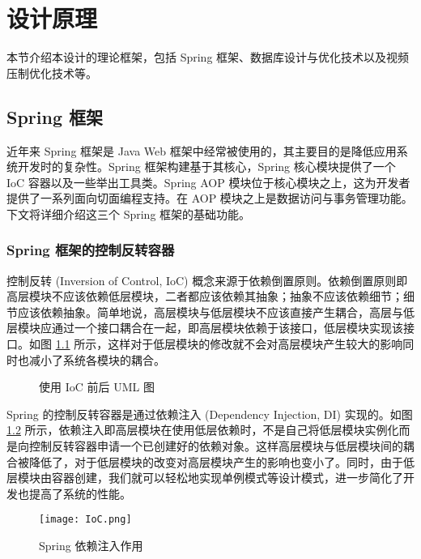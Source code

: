 \chapter{设计原理}\label{sec:theory}

本节介绍本设计的理论框架，包括 Spring 框架、数据库设计与优化技术以及视频压制优化技术等。

\section{Spring 框架}

近年来 Spring 框架是 Java Web 框架中经常被使用的，其主要目的是降低应用系统开发时的复杂性。Spring 框架构建基于其核心，Spring 核心模块提供了一个 IoC 容器以及一些举出工具类。Spring AOP 模块位于核心模块之上，这为开发者提供了一系列面向切面编程支持。在 AOP 模块之上是数据访问与事务管理功能\cite{walls2005spring}。下文将详细介绍这三个 Spring 框架的基础功能。

\subsection{Spring 框架的控制反转容器}

控制反转 (Inversion of Control, IoC) 概念来源于依赖倒置原则。依赖倒置原则即高层模块不应该依赖低层模块，二者都应该依赖其抽象；抽象不应该依赖细节；细节应该依赖抽象\cite{gamma1995design}。简单地说，高层模块与低层模块不应该直接产生耦合，高层与低层模块应通过一个接口耦合在一起，即高层模块依赖于该接口，低层模块实现该接口。如图 \ref{fig:beforeAndAfter} 所示，这样对于低层模块的修改就不会对高层模块产生较大的影响同时也减小了系统各模块的耦合。

\begin{figure}[!ht]
\centering
{}\quad
{}
\caption{使用 IoC 前后 UML 图}
\label{fig:beforeAndAfter}
\end{figure}

Spring 的控制反转容器是通过依赖注入 (Dependency Injection, DI) 实现的。如图 \ref{fig:DI} 所示，依赖注入即高层模块在使用低层依赖时，不是自己将低层模块实例化而是向控制反转容器申请一个已创建好的依赖对象\cite{prasanna2009dependency}。这样高层模块与低层模块间的耦合被降低了，对于低层模块的改变对高层模块产生的影响也变小了。同时，由于低层模块由容器创建，我们就可以轻松地实现单例模式等设计模式，进一步简化了开发也提高了系统的性能。

\begin{figure}[!ht]
    \centering
    \texttt{[image: IoC.png]}
    \caption{Spring 依赖注入作用}
    \label{fig:DI}
\end{figure}

